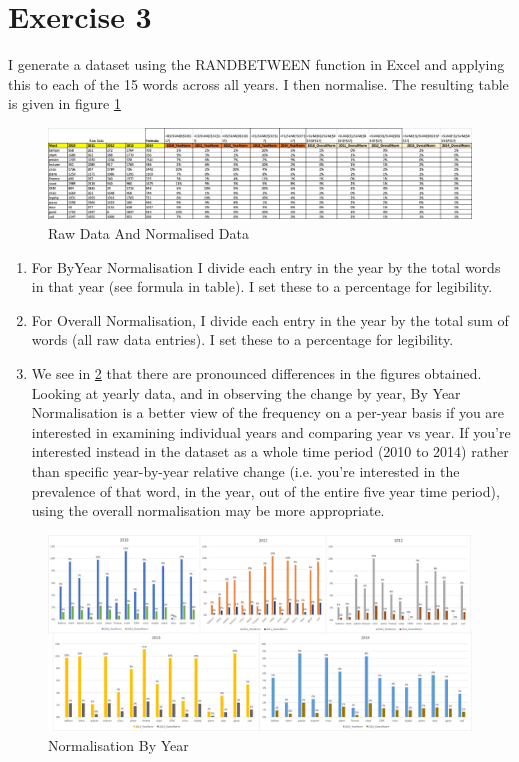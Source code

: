 \documentclass{article}
\begin{document}
	

\section{Exercise 3}
I generate a dataset using the RANDBETWEEN function in Excel and applying this to each of the 15 words across all years. I then normalise. The resulting table is given in figure \ref{q3}
\begin{figure}[h!]
	\centering
	\includegraphics[width=0.95\linewidth]{q3table.png}
	\caption{Raw Data And Normalised Data}\label{q3}
\end{figure}
\begin{enumerate}
	\item For ByYear Normalisation I divide each entry in the year by the total words in that year (see formula in table). I set these to a percentage for legibility.
	\item For Overall Normalisation, I divide each entry in the year by the total sum of words (all raw data entries). I set these to a percentage for legibility.
	\item We see in \ref{table} that there are pronounced differences in the figures obtained. Looking at yearly data, and in observing the change by year, By Year Normalisation is a better view of the frequency on a per-year basis if you are interested in examining individual years and comparing year vs year. If you're interested instead in the dataset as a whole time period (2010 to 2014) rather than specific year-by-year relative change (i.e. you're interested in the prevalence of that word, in the year, out of the entire five year time period), using the overall normalisation may be more appropriate.
\end{enumerate}

\begin{figure}[h!]
	\centering
	\includegraphics[width=0.95\linewidth]{graphs.png}
	\caption{Normalisation By Year}\label{table}
\end{figure}



	
\end{document}
